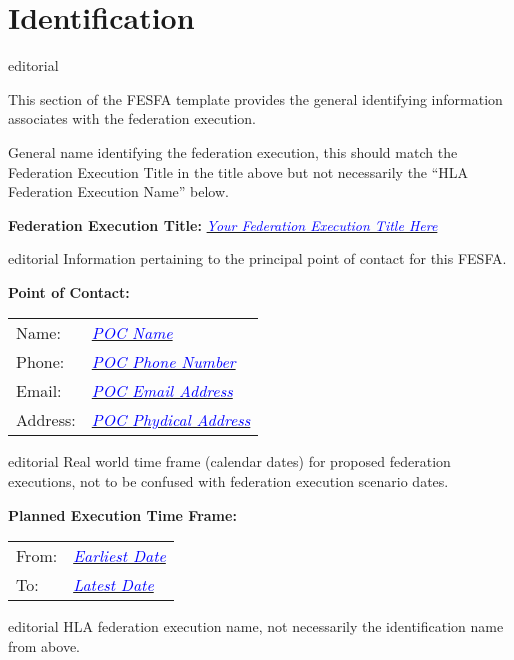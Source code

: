 \documentclass[11pt,english,letterpaper]{article}
\newcommand{\example}[1]{{\textcolor{blue}{\textit{#1}}}}
\begin{document}
\section*{Identification}

\begin{shownto}{editorial}
{\color{red} This section of the FESFA template provides the general
identifying information associates with the federation execution.

General name identifying the federation execution, this should match the
\textlangle{}Federation Execution Title\textrangle{} in the title above but not
necessarily the “HLA Federation Execution Name” below.}
\end{shownto}

\textbf{Federation Execution Title: } \underline{\example{Your Federation Execution Title Here}}

\begin{shownto}{editorial}
{\color{red} Information pertaining to the principal point of contact for this FESFA.}
\end{shownto}

\textbf{Point of Contact: }

\hspace{0.25in}
\begin{tabularx}{\textwidth}{lX}
Name:    & \underline{\example{POC Name}} \\
Phone:   & \underline{\example{POC Phone Number}} \\
Email:   & \underline{\example{POC Email Address}} \\
Address: & \underline{\example{POC Phydical Address}}
\end{tabularx}

\begin{shownto}{editorial}
{\color{red} Real world time frame (calendar dates) for proposed federation
executions, not to be confused with federation execution scenario dates.}
\end{shownto}

\textbf{Planned Execution Time Frame: }

\hspace{0.25in}
\begin{tabular}{ll}
From: & \underline{\example{Earliest Date}} \\
To:   & \underline{\example{Latest Date}}
\end{tabular}

\begin{shownto}{editorial}
{\color{red} HLA federation execution name, not necessarily the identification
name from above.}
\end{shownto}
\end{document}
